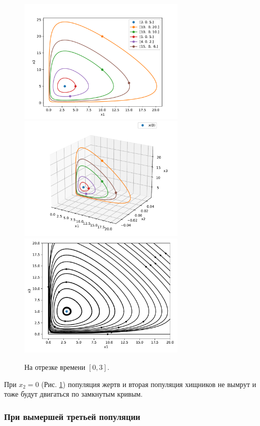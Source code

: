     \begin{figure}[H]
        \centering
        \includegraphics[width=8cm]{pictures/x2_0phase.pdf}
        \includegraphics[width=8cm]{pictures/x2_0phase3.pdf}
        \includegraphics[width=8cm]{pictures/x2_0vector.pdf}
        \caption{На отрезке времени \( [0, 3] \).}\label{lvx2_0}
    \end{figure}
    При \(x_2 = 0\) (Рис. \ref{lvx2_0}) популяция жертв и вторая популяция хищников не вымрут и тоже будут двигаться по замкнутым кривым.


    \subsubsection{При вымершей третьей популяции}

